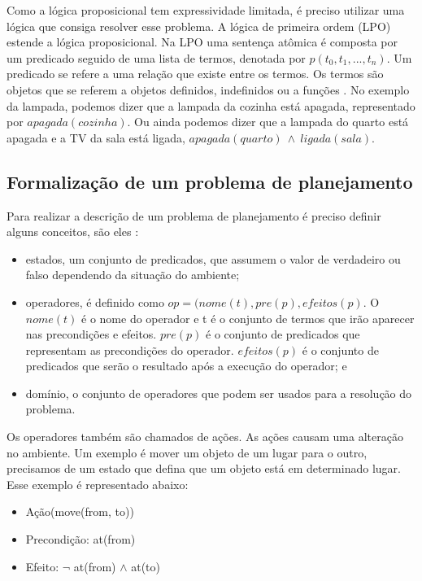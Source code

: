 Como a lógica proposicional tem expressividade limitada, é preciso utilizar uma lógica que consiga resolver esse problema. A lógica de primeira ordem (LPO) estende a lógica proposicional. Na LPO uma sentença atômica é composta por um predicado seguido de uma lista de termos, denotada por $p(t_{0}, t_{1}, ..., t_{n})$. Um predicado se refere a uma relação que existe entre os termos. Os termos são objetos que se referem a objetos definidos, indefinidos ou a funções \cite{intelligence2003modern}. No exemplo da lampada, podemos dizer que a lampada da cozinha está apagada, representado por $apagada(cozinha)$. Ou ainda podemos dizer que a lampada do quarto está apagada e a TV da sala está ligada, $apagada(quarto)~ \wedge~ ligada(sala)$.  

\subsection{Formalização de um problema de planejamento}

Para realizar a descrição de um problema de planejamento é preciso definir alguns conceitos, são eles \cite{intelligence2003modern, ghallab2004automated, meneguzzi2015planning}:

\begin{itemize}
	\item estados, um conjunto de predicados, que assumem o valor de verdadeiro ou falso dependendo da situação do ambiente; 
	\item operadores, é definido como $op = (nome(t), pre(p), efeitos(p)$. O $nome(t)$ é o nome do operador e t é o conjunto de termos que irão aparecer nas precondições e efeitos. $pre(p)$ é o conjunto de predicados que representam as precondições do operador. $efeitos(p)$ é o conjunto de predicados que serão o resultado após a execução do operador; e
	\item domínio, o conjunto de operadores que podem ser usados para a resolução do problema.
\end{itemize}

Os operadores também são chamados de ações. As ações causam uma alteração no ambiente. Um exemplo é mover um objeto de um lugar para o outro, precisamos de um estado que defina que um objeto está em determinado lugar. Esse exemplo é representado abaixo:

\begin{itemize}
	\item Ação(move(from, to))
	\item Precondição: at(from)
	\item Efeito: $\neg$ at(from) $\wedge$ at(to)
\end{itemize}

